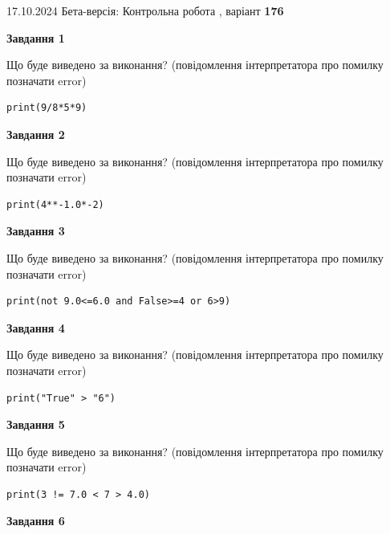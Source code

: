 \documentclass[12pt, ukrainian]{article}
\begin{document}
{\Large{17.10.2024 Бета-версія: Контрольна робота , варіант  \No \textbf { 176 }\par}}
{
\begin {large}
{\begin {center}\textbf{Завдання 1}\end {center}}

Що буде виведено за виконання? (повідомлення інтерпретатора про помилку позначати error)\par
\begin{verbatim}
print(9/8*5*9)
\end{verbatim}

{\begin {center}\textbf{Завдання 2}\end {center}}

Що буде виведено за виконання? (повідомлення інтерпретатора про помилку позначати error)\par
\begin{verbatim}
print(4**-1.0*-2)
\end{verbatim}

{\begin {center}\textbf{Завдання 3}\end {center}}

Що буде виведено за виконання? (повідомлення інтерпретатора про помилку позначати error)\par
\begin{verbatim}
print(not 9.0<=6.0 and False>=4 or 6>9)
\end{verbatim}

{\begin {center}\textbf{Завдання 4}\end {center}}

Що буде виведено за виконання? (повідомлення інтерпретатора про помилку позначати error)\par
\begin{verbatim}
print("True" > "6")
\end{verbatim}

{\begin {center}\textbf{Завдання 5}\end {center}}

Що буде виведено за виконання? (повідомлення інтерпретатора про помилку позначати error)\par
\begin{verbatim}
print(3 != 7.0 < 7 > 4.0)
\end{verbatim}

{\begin {center}\textbf{Завдання 6}\end {center}}


\end{large}}
\end{document}
